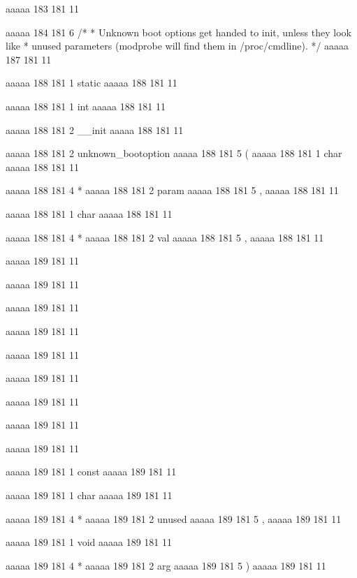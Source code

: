 aaaaa 183 181
11


aaaaa 184 181
6
/*
 * Unknown boot options get handed to init, unless they look like
 * unused parameters (modprobe will find them in /proc/cmdline).
 */
aaaaa 187 181
11


aaaaa 188 181
1
static
aaaaa 188 181
11
 
aaaaa 188 181
1
int
aaaaa 188 181
11
 
aaaaa 188 181
2
__init
aaaaa 188 181
11
 
aaaaa 188 181
2
unknown_bootoption
aaaaa 188 181
5
(
aaaaa 188 181
1
char
aaaaa 188 181
11
 
aaaaa 188 181
4
*
aaaaa 188 181
2
param
aaaaa 188 181
5
,
aaaaa 188 181
11
 
aaaaa 188 181
1
char
aaaaa 188 181
11
 
aaaaa 188 181
4
*
aaaaa 188 181
2
val
aaaaa 188 181
5
,
aaaaa 188 181
11


aaaaa 189 181
11
	
aaaaa 189 181
11
	
aaaaa 189 181
11
	
aaaaa 189 181
11
	
aaaaa 189 181
11
 
aaaaa 189 181
11
 
aaaaa 189 181
11
 
aaaaa 189 181
11
 
aaaaa 189 181
11
 
aaaaa 189 181
1
const
aaaaa 189 181
11
 
aaaaa 189 181
1
char
aaaaa 189 181
11
 
aaaaa 189 181
4
*
aaaaa 189 181
2
unused
aaaaa 189 181
5
,
aaaaa 189 181
11
 
aaaaa 189 181
1
void
aaaaa 189 181
11
 
aaaaa 189 181
4
*
aaaaa 189 181
2
arg
aaaaa 189 181
5
)
aaaaa 189 181
11


